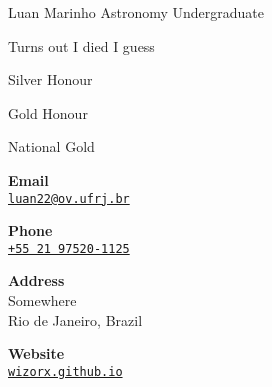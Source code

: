 \documentclass{article}
\begin{document}
\begin{cv}[avatar]{Luan Marinho }{Astronomy Undergraduate}
\begin{cvevent}[20??]
Turns out I died I guess
\end{cvevent}

\begin{cvevent}[2021]
Silver Honour
\end{cvevent}

\begin{cvevent}[2020]
    Gold Honour
\end{cvevent}


\begin{cvevent}[2019]
    National Gold
\end{cvevent}


\cvsidebar %


\begin{cvitem}[Envelope][0.6]
    \textbf{Email}\\
    \href{mailto:james.bond@mi6.gov}{\texttt{luan22@ov.ufrj.br}}
\end{cvitem}

\cvseparator[3]
\begin{cvitem}[Phone][0.6]
    \textbf{Phone}\\
    \href{tel:+5521975201125}{\texttt{+55 21 97520-1125}}
\end{cvitem}

\cvseparator[3]
\begin{cvitem}[Home][0.6]
    \textbf{Address}\\
    Somewhere\\ Rio de Janeiro, Brazil
\end{cvitem}

\cvseparator[3]
\begin{cvitem}[Globe][0.6]
    \textbf{Website}\\
    \href{https://wizorx.github.io}{\texttt{wizorx.github.io}}
\end{cvitem}





\end{cv}
\end{document}
